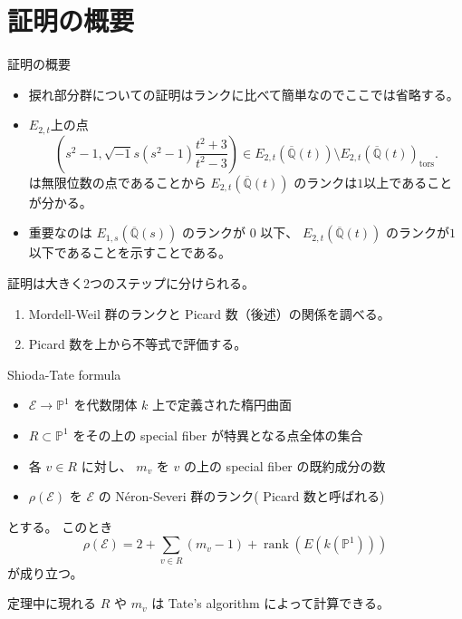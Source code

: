 \documentclass{classes/mybeamer}
\DeclareMathOperator{\rank}{rank}
\newcommand{\Neron}{N\'eron}
\begin{document}
\section{証明の概要}
\begin{frame}{証明の概要}
    \begin{itemize}
        \item 捩れ部分群についての証明はランクに比べて簡単なのでここでは省略する。
        \item $E_{2,t}$上の点
            \begin{equation*}
                \left(s^{2} - 1, \sqrt{-1} s(s^{2} - 1) \frac{t^{2} + 3}{t^{2} - 3} \right) \in E_{2,t}(\overline{\mathbb{Q}}(t)) \setminus E_{2,t}(\overline{\mathbb{Q}}(t))_{\text{tors}}.
            \end{equation*}
            は無限位数の点であることから $E_{2,t}(\overline{\mathbb{Q}}(t))$ のランクは$1$以上であることが分かる。
        \item 重要なのは $E_{1,s}(\overline{\mathbb{Q}}(s))$ のランクが $0$ 以下、 $ E_{2,t}(\overline{\mathbb{Q}}(t))$ のランクが$1$以下であることを示すことである。
    \end{itemize}

    \vspace{1cm}

    証明は大きく2つのステップに分けられる。
    \begin{enumerate}
        \item Mordell-Weil 群のランクと Picard 数（後述）の関係を調べる。
        \item Picard 数を上から不等式で評価する。
    \end{enumerate}
\end{frame}

\begin{frame}{Shioda-Tate formula}
    \begin{thm}
        \label{thm:shioda}
        \begin{itemize}
            \item $\mathcal{E} \to \mathbb{P}^1$ を代数閉体 $k$ 上で定義された楕円曲面
            \item $R \subset \mathbb{P}^1$ をその上の special fiber が特異となる点全体の集合
            \item 各 $v \in R$ に対し、 $m_{v}$ を $v$ の上の special fiber の既約成分の数
            \item $\rho(\mathcal{E})$ を $\mathcal{E}$ の \Neron-Severi 群のランク( Picard 数と呼ばれる)
        \end{itemize}
        とする。
        このとき
        \begin{equation*}
            \rho (\mathcal{E}) = 2 + \sum_{v \in R} (m_{v} - 1) + \rank(E(k(\mathbb{P}^1)))
        \end{equation*}
        が成り立つ。
    \end{thm}
    定理中に現れる $R$ や $m_v$ は Tate's algorithm によって計算できる。
\end{frame}
\end{document}
